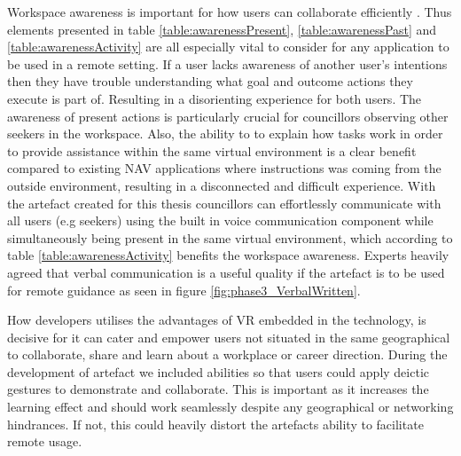 Workspace awareness is important for how users can collaborate efficiently \cite{gutwin1996workspace}. Thus elements presented in table \ref{table:awarenessPresent}, \ref{table:awarenessPast}  and \ref{table:awarenessActivity} are all especially vital to consider for any application to be used in a remote setting. If a user lacks awareness of another user's intentions then they have trouble understanding what goal and outcome actions they execute is part of. Resulting in a disorienting experience for both users. The awareness of present actions is particularly crucial for councillors observing other seekers in the workspace. Also, the ability to to explain how tasks work in order to provide assistance within the same virtual environment is a clear benefit compared to existing NAV applications where instructions was coming from the outside environment, resulting in a disconnected and difficult experience. With the artefact created for this thesis councillors can effortlessly communicate with all users (e.g seekers) using the built in voice communication component while simultaneously being present in the same virtual environment, which according to table \ref{table:awarenessActivity} benefits the workspace awareness. Experts heavily agreed that verbal communication is a useful quality if the artefact is to be used for remote guidance as seen in figure \ref{fig:phase3_VerbalWritten}.         




How developers utilises the advantages of VR embedded in the technology, is decisive for it can cater and empower users not situated in the same geographical to collaborate, share and learn about a workplace or career direction. During the development of artefact we included abilities so that users could apply deictic gestures to demonstrate and collaborate. This is important as it increases the learning effect \cite{stahl2006computer} and should work seamlessly despite any geographical or networking hindrances. If not, this could heavily distort the artefacts ability to facilitate remote usage.               


